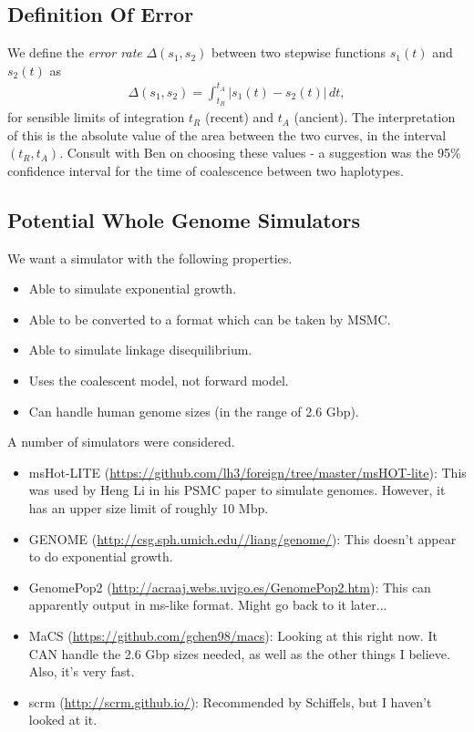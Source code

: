 \documentclass[11pt,a4paper]{article}
\begin{document}
\subsection{Definition Of Error}
We define the \emph{error rate} $\Delta (s_1,s_2)$ between two stepwise functions $s_1(t)$ and $s_2(t)$ as 
\begin{eqnarray}
\Delta (s_1,s_2) = \int_{t_R}^{t_A} |s_1(t)-s_2(t)| \,dt, \label{errorRate}
\end{eqnarray}
for sensible limits of integration $t_R$ (recent) and $t_A$ (ancient). The interpretation of this is the absolute value of the area between the two curves, in the interval $(t_R,t_A)$. Consult with Ben on choosing these values - a suggestion was the 95\% confidence interval for the time of coalescence between two haplotypes.

\subsection{Potential Whole Genome Simulators}
We want a simulator with the following properties.
\begin{itemize}
\item Able to simulate exponential growth.
\item Able to be converted to a format which can be taken by MSMC.
\item Able to simulate linkage disequilibrium.
\item Uses the coalescent model, not forward model.
\item Can handle human genome sizes (in the range of 2.6 Gbp).
\end{itemize}
A number of simulators were considered.
\begin{itemize}
\item msHot-LITE (\url{https://github.com/lh3/foreign/tree/master/msHOT-lite}): This was used by Heng Li in his PSMC paper to simulate genomes. However, it has an upper size limit of roughly 10 Mbp.
\item GENOME (\url{http://csg.sph.umich.edu//liang/genome/}): This doesn't appear to do exponential growth.
\item GenomePop2 (\url{http://acraaj.webs.uvigo.es/GenomePop2.htm}): This can apparently output in ms-like format. Might go back to it later...
\item MaCS (\url{https://github.com/gchen98/macs}): Looking at this right now. It CAN handle the 2.6 Gbp sizes needed, as well as the other things I believe. Also, it's very fast.
\item scrm (\url{http://scrm.github.io/}): Recommended by Schiffels, but I haven't looked at it.
\end{itemize}
\end{document}
